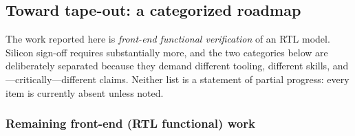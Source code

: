 \documentclass[conference]{IEEEtran}
\begin{document}
\subsection{Toward tape-out: a categorized roadmap}
\label{sec:tapeout}

The work reported here is \emph{front-end functional verification} of an
RTL model. Silicon sign-off requires substantially more, and the two
categories below are deliberately separated because they demand different
tooling, different skills, and---critically---different claims. Neither
list is a statement of partial progress: every item is currently absent
unless noted.

\subsubsection{Remaining front-end (RTL functional) work}
\end{document}
